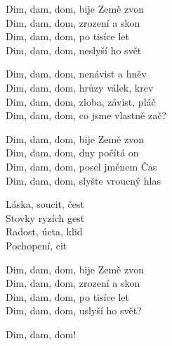 
\ve{}
Dim, dam, dom, bije Země zvon\\
Dim, dam, dom, zrození a skon\\
Dim, dam, dom, po tisíce let\\
Dim, dam, dom, neslyší ho svět

\ve{}
Dim, dam, dom, nenávist a hněv\\
Dim, dam, dom, hrůzy válek, krev\\
Dim, dam, dom, zloba, závist, pláč\\
Dim, dam, dom, co jsme vlastně zač?

\ve{}
Dim, dam, dom, bije Země zvon\\
Dim, dam, dom, dny počítá on\\
Dim, dam, dom, posel jménem Čas\\
Dim, dam, dom, slyšte vroucný hlas

\re{}
Láska, soucit, čest \\
Stovky ryzích gest \\
Radost, úcta, klid \\
Pochopení, cit

\ve{}
Dim, dam, dom, bije Země zvon\\
Dim, dam, dom, zrození a skon\\
Dim, dam, dom, po tisíce let\\
Dim, dam, dom, uslyší ho svět?

\re{}
Dim, dam, dom! 

\esong